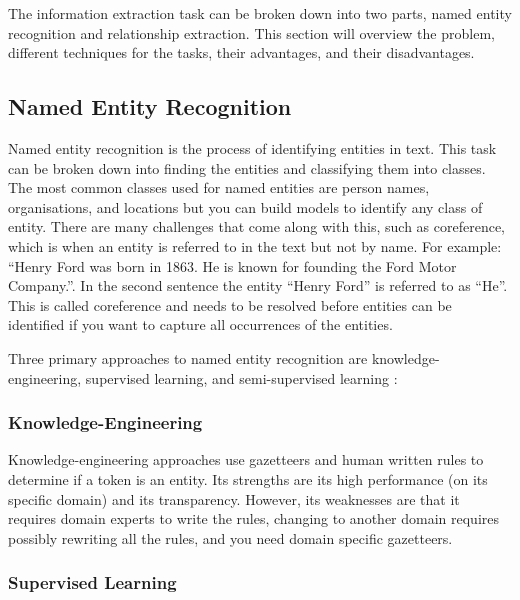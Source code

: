 \documentclass[11pt,oneside]{book}
\begin{document}
The information extraction task can be broken down into two parts, named entity recognition and relationship extraction. This section will overview the problem, different techniques for the tasks, their advantages, and their disadvantages.

\subsection{Named Entity Recognition}

Named entity recognition is the process of identifying entities in text. This task can be broken down into finding the entities and classifying them into classes. The most common classes used for named entities are person names, organisations, and locations but you can build models to identify any class of entity. There are many challenges that come along with this, such as coreference, which is when an entity is referred to in the text but not by name. For example: “Henry Ford was born in 1863. He is known for founding the Ford Motor Company.”. In the second sentence the entity “Henry Ford” is referred to as “He”. This is called coreference and needs to be resolved before entities can be identified if you want to capture all occurrences of the entities.

Three primary approaches to named entity recognition are knowledge-engineering, supervised learning, and semi-supervised learning \citep{text_processing_lecture_5}:

\subsubsection{Knowledge-Engineering}

Knowledge-engineering approaches use gazetteers and human written rules to determine if a token is an entity. Its strengths are its high performance (on its specific domain) and its transparency. However, its weaknesses are that it requires domain experts to write the rules, changing to another domain requires possibly rewriting all the rules, and you need domain specific gazetteers.

\subsubsection{Supervised Learning}
\end{document}

